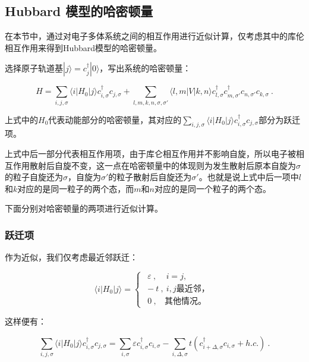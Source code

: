 

\subsection{Hubbard 模型的哈密顿量}

在本节中，通过对电子多体系统之间的相互作用进行近似计算，仅考虑其中的库伦相互作用来得到Hubbard模型的哈密顿量。

选择原子轨道基$|j\rangle =c_j^\dagger |0\rangle$，写出系统的哈密顿量：

\begin{equation}
H=\sum\limits_{i,j,\sigma}\langle i |H_0| j \rangle c_{i,\sigma}^\dagger c_{j,\sigma}+\sum\limits_{l,m,k,n,\sigma,\sigma'}\langle l,m|V|k,n\rangle c_{l,\sigma}^\dagger  c_{m,\sigma'}^\dagger c_{n,\sigma'}c_{k,\sigma}~.
\end{equation}

上式中的$H_0$代表动能部分的哈密顿量，其对应的$\sum\limits_{i,j,\sigma}\langle i |H_0| j \rangle c_{i,\sigma}^\dagger c_{j,\sigma}$部分为跃迁项。

上式中后一部分代表相互作用项，由于库仑相互作用并不影响自旋，所以电子被相互作用散射后自旋不变，这一点在哈密顿量中的体现则为发生散射后原本自旋为$\sigma$的粒子自旋还为$\sigma$，自旋为$
\sigma'$的粒子散射后自旋还为$\sigma'$。也就是说上式中后一项中$l$和$k$对应的是同一粒子的两个态，而$m$和$n$对应的是同一个粒子的两个态。

下面分别对哈密顿量的两项进行近似计算。

\subsubsection{跃迁项}
作为近似，我们仅考虑最近邻跃迁：

\begin{equation}
\langle i|H_0|j \rangle=\left\{
\begin{array}{lc}
~~\varepsilon~,~~~~~ i=j, \\
~-t~,~i,j\text{最近邻，} \\
~~0~,~~~~\text{其他情况。}
\end{array}\right.~
\end{equation}

这样便有：

\begin{equation}
\sum\limits_{i,j,\sigma}\langle i|H_0|j \rangle c_{i,\sigma}^\dagger c_{j,\sigma}=\sum\limits_{i,\sigma}\varepsilon c_{i,\sigma}^\dagger c_{i,\sigma}-\sum\limits_{i,\Delta,\sigma}t\left(c_{i+\Delta,\sigma}^\dagger c_{i,\sigma}+h.c.\right)~.
\end{equation}

